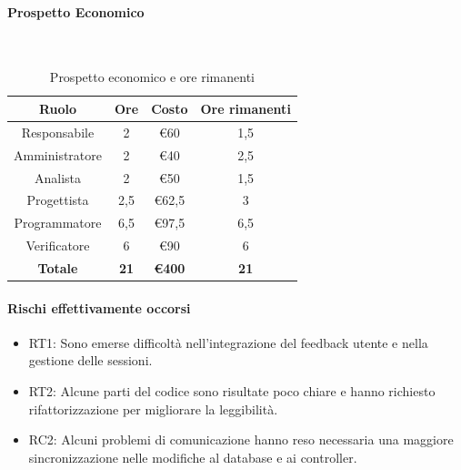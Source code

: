 \documentclass{article}
\begin{document}
            \paragraph{Prospetto Economico}\mbox{}\\
            \begin{table}[H]
                \centering
                \begin{tabular}{|c|c|c|c|}
                \hline
                \textbf{Ruolo}  & \textbf{Ore}  & \textbf{Costo}      & \textbf{Ore rimanenti} \\ \hline
                Responsabile    & 2             & €60                 & 1,5                    \\ \hline
                Amministratore  & 2             & €40                 & 2,5                    \\ \hline
                Analista        & 2             & €50                 & 1,5                    \\ \hline
                Progettista     & 2,5           & €62,5               & 3                      \\ \hline
                Programmatore   & 6,5           & €97,5               & 6,5                    \\ \hline
                Verificatore    & 6             & €90                 & 6                      \\ \hline
                \textbf{Totale} & \textbf{21}   & \textbf{\euro400}   & \textbf{21}            \\ \hline
                \end{tabular}
                \caption{Prospetto economico e ore rimanenti}
            \end{table}
            
            \paragraph{Rischi effettivamente occorsi}
            \begin{itemize}
                \item RT1: Sono emerse difficoltà nell'integrazione del feedback utente e nella gestione delle sessioni.
                \item RT2: Alcune parti del codice sono risultate poco chiare e hanno richiesto rifattorizzazione per migliorare la leggibilità.
                \item RC2: Alcuni problemi di comunicazione hanno reso necessaria una maggiore sincronizzazione nelle modifiche al database e ai controller.
            \end{itemize}
            
\end{document}

